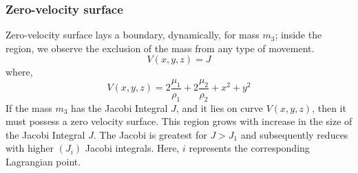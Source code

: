 \subsubsection{Zero-velocity surface}
Zero-velocity surface lays a boundary, dynamically, for mass $m_3$; inside the region, we observe the exclusion of the mass from any type of movement. 
\begin{equation}
    V(x, y, z)= J
\end{equation}
where,
\begin{equation}
    V(x, y, z) = 2\frac{\mu_1}{\rho_1} + 2\frac{\mu_2}{\rho_2} + x^2 + y^2
\end{equation}
If the mass $m_3$ has the Jacobi Integral $J$, and it lies on curve $V(x, y, z)$, then it must possess a zero velocity surface. 
This region grows with increase in the size of the Jacobi Integral $J$. The Jacobi is greatest for $J>J_1$ and subsequently reduces with higher $(J_i)$ Jacobi integrals. Here, $i$ represents the corresponding Lagrangian point.